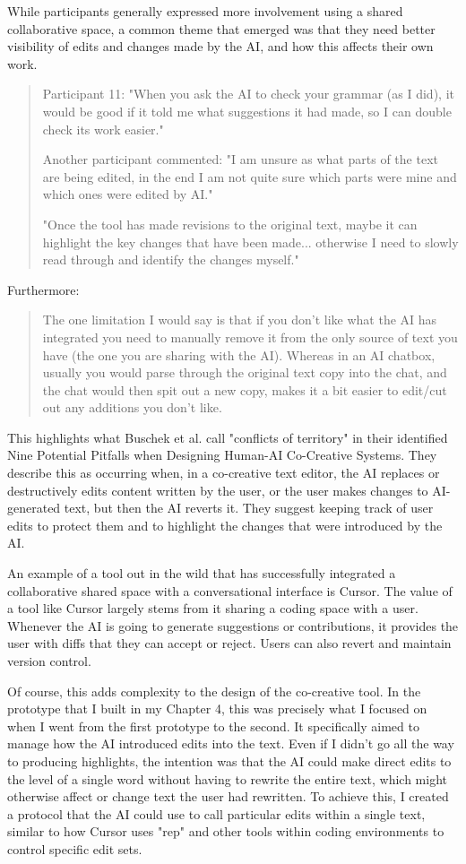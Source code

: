 While participants generally expressed more involvement using a shared collaborative space, a common theme that emerged was that they need better visibility of edits and changes made by the AI, and how this affects their own work.

\begin{quote}
Participant 11: "When you ask the AI to check your grammar (as I did), it would be good if it told me what suggestions it had made, so I can double check its work easier."

Another participant commented: "I am unsure as what parts of the text are being edited, in the end I am not quite sure which parts were mine and which ones were edited by AI."

"Once the tool has made revisions to the original text, maybe it can highlight the key changes that have been made... otherwise I need to slowly read through and identify the changes myself."
\end{quote}
Furthermore:
\begin{quote}
The one limitation I would say is that if you don't like what the AI has integrated you need to manually remove it from the only source of text you have (the one you are sharing with the AI). Whereas in an AI chatbox, usually you would parse through the original text copy into the chat, and the chat would then spit out a new copy, makes it a bit easier to edit/cut out any additions you don't like.
\end{quote}
This highlights what Buschek et al. \cite{Buschek2021-ks} call "conflicts of territory" in their identified Nine Potential Pitfalls when Designing Human-AI Co-Creative Systems. They describe this as occurring when, in a co-creative text editor, the AI replaces or destructively edits content written by the user, or the user makes changes to AI-generated text, but then the AI reverts it. They suggest keeping track of user edits to protect them and to highlight the changes that were introduced by the AI.

An example of a tool out in the wild that has successfully integrated a collaborative shared space with a conversational interface is Cursor. The value of a tool like Cursor largely stems from it sharing a coding space with a user. Whenever the AI is going to generate suggestions or contributions, it provides the user with diffs that they can accept or reject. Users can also revert and maintain version control.

Of course, this adds complexity to the design of the co-creative tool. In the prototype that I built in my Chapter 4, this was precisely what I focused on when I went from the first prototype to the second. It specifically aimed to manage how the AI introduced edits into the text. Even if I didn't go all the way to producing highlights, the intention was that the AI could make direct edits to the level of a single word without having to rewrite the entire text, which might otherwise affect or change text the user had rewritten. To achieve this, I created a protocol that the AI could use to call particular edits within a single text, similar to how Cursor uses "rep" and other tools within coding environments to control specific edit sets.

